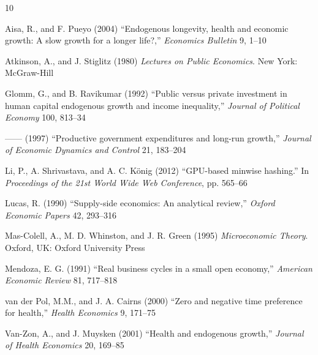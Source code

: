\documentclass{cje}          %
\theoremstyle{plain}%
\theoremstyle{definition}
\theoremstyle{remark}
\begin{document}
\begin{thebibliography}{10}
\newcommand{\enquote}[1]{``#1''}
\providecommand{\natexlab}[1]{#1}

Aisa, R., and F. Pueyo (2004) \enquote{Endogenous longevity, health and
  economic growth: A slow growth for a longer life?,} \emph{Economics Bulletin}
  9, 1--10

Atkinson, A., and J. Stiglitz (1980) \emph{Lectures on Public Economics}. New
  York: McGraw-Hill

Glomm, G., and B. Ravikumar (1992) \enquote{Public versus private investment in
  human capital endogenous growth and income inequality,} \emph{Journal of
  Political Economy} 100, 813--34

------ (1997) \enquote{Productive government expenditures and long-run
  growth,} \emph{Journal of Economic Dynamics and Control} 21, 183--204

Li, P., A. Shrivastava, and A. C. K{\"o}nig (2012) \enquote{{GPU}-based minwise
  hashing.} In \emph{Proceedings of the 21st World Wide Web Conference}, pp. 565--66

Lucas, R. (1990) \enquote{Supply-side economics: An analytical review,}
  \emph{Oxford Economic Papers} 42, 293--316

Mas-Colell, A., M. D. Whinston, and J. R. Green (1995) \emph{Microeconomic
  Theory}. Oxford, UK: Oxford University Press

Mendoza, E. G. (1991) \enquote{Real business cycles in a small open economy,}
  \emph{American Economic Review} 81, 717--818

van der Pol, M.M., and J. A. Cairns (2000) \enquote{Zero and negative time
  preference for health,} \emph{Health Economics} 9, 171--75

Van-Zon, A., and J. Muysken (2001) \enquote{Health and endogenous growth,}
  \emph{Journal of Health Economics} 20, 169--85

\end{thebibliography}


\label{lastpage}
\end{document}
